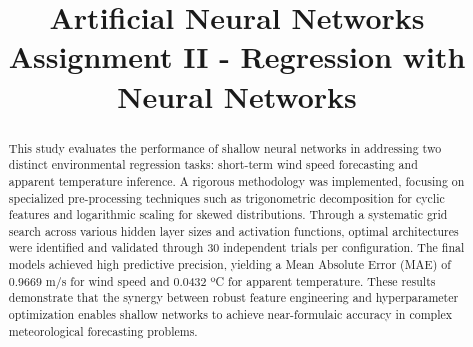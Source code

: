 \documentclass[conference]{IEEEtran}
\begin{document}


\title{Artificial Neural Networks \\ \large Assignment II - Regression with Neural Networks}

\author{
\and
{}
}

\maketitle

\begin{abstract}
This study evaluates the performance of shallow neural networks in addressing two distinct environmental regression tasks: short-term wind speed forecasting and apparent temperature inference. A rigorous methodology was implemented, focusing on specialized pre-processing techniques such as trigonometric decomposition for cyclic features and logarithmic scaling for skewed distributions. Through a systematic grid search across various hidden layer sizes and activation functions, optimal architectures were identified and validated through 30 independent trials per configuration. The final models achieved high predictive precision, yielding a Mean Absolute Error (MAE) of $0.9669$ m/s for wind speed and $0.0432$ ºC for apparent temperature. These results demonstrate that the synergy between robust feature engineering and hyperparameter optimization enables shallow networks to achieve near-formulaic accuracy in complex meteorological forecasting problems.
\end{abstract}
\end{document}
